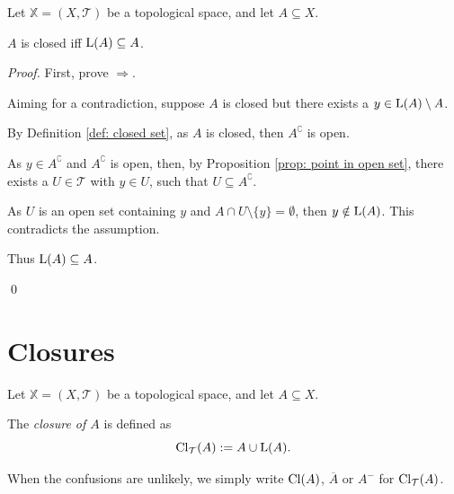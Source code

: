\begin{proposition}
	\label{prop: closed iff contain all limit point}
	Let $\mathbb X = (X, \mathcal T)$ be a topological space, and let $A \subseteq X$.
	
	$A$ is closed iff $\mathrm{L}(A) \subseteq A$.
	
	\begin{proof}
		First, prove $\Rightarrow$.
		
		Aiming for a contradiction, suppose $A$ is closed but there exists a $y \in \mathrm{L}(A) \setminus A$.
		
		By Definition \ref{def: closed set}, as $A$ is closed, then $A^\complement$ is open.
		
		As $y \in A^\complement$ and $A^\complement$ is open, then, by Proposition \ref{prop: point in open set}, there exists a $U \in \mathcal T$ with $y \in U$, such that $U \subseteq A^\complement$.
		
		As $U$ is an open set containing $y$ and $A \cap U \setminus \{y\} = \emptyset$, then $y \notin \mathrm{L}(A)$. This contradicts the assumption.
		
		Thus $\mathrm{L}(A) \subseteq A$.
		
		\qed
	\end{proof}
\end{proposition}


\section{Closures}


\begin{definition}
	\label{def: closure}
	Let $\mathbb X = (X, \mathcal T)$ be a topological space, and let $A \subseteq X$.
	
	The \textit{closure of $A$} is defined as
	$$
	\mathrm{Cl}_\mathcal T(A) := A \cup \mathrm{L}(A).
	$$
	
	When the confusions are unlikely, we simply write $\mathrm{Cl}(A)$, $\overline A$ or $A^-$ for $\mathrm{Cl}_\mathcal T(A)$.
\end{definition}



